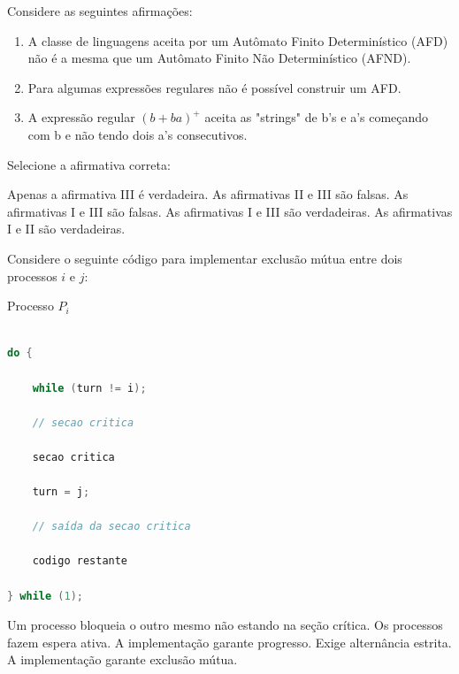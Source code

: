 \documentclass[12pt, addpoints]{exam}
\begin{document}
\begin{questions}
\question

Considere as seguintes afirmações:

\begin{enumerate}[label=\Roman*.]

    \item A classe de linguagens aceita por um Autômato Finito Determinístico (AFD) não é a mesma que um Autômato Finito Não Determinístico (AFND).

    \item Para algumas expressões regulares não é possível construir um AFD.

    \item A expressão regular \((b + ba)^+\) aceita as "strings" de b's e a's começando com b e não tendo dois a's consecutivos.

\end{enumerate}

Selecione a afirmativa correta:
\begin{choices}
\choice Apenas a afirmativa III é verdadeira.
\choice As afirmativas II e III são falsas.
\choice As afirmativas I e III são falsas.
\choice As afirmativas I e III são verdadeiras.
\choice As afirmativas I e II são verdadeiras.
\end{choices}

\question

Considere o seguinte código para implementar exclusão mútua entre dois processos \(i\) e \(j\): 

Processo \(P_i\)

\begin{lstlisting}[language=C, basicstyle=\ttfamily\small]

do {

    while (turn != i); 

    // secao critica

    secao critica

    turn = j;

    // saída da secao critica

    codigo restante

} while (1);

\end{lstlisting} 
\begin{choices}
\choice Um processo bloqueia o outro mesmo não estando na seção crítica.
\choice Os processos fazem espera ativa.
\choice A implementação garante progresso. 
\choice Exige alternância estrita. 
\choice A implementação garante exclusão mútua.
\end{choices}


\end{questions}
\end{document}
